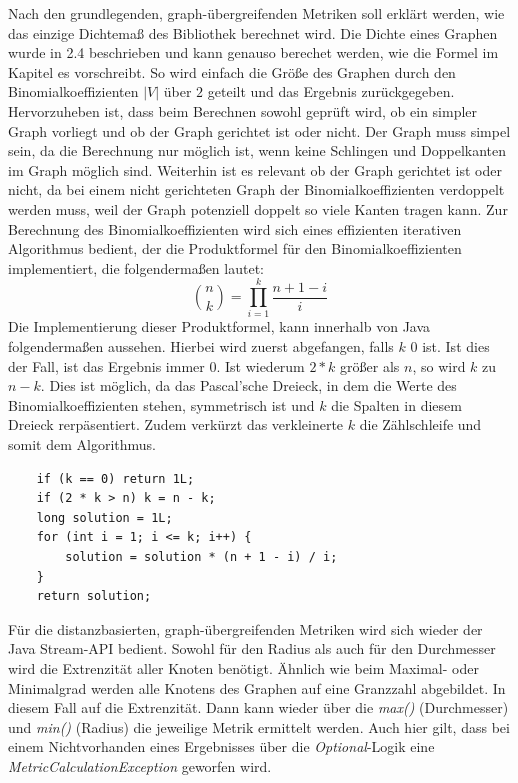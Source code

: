\documentclass[a4paper,12pt,ngerman,chapterprefix=false,listof=totoc,bibliography=totoc]{scrreprt}
\begin{document}
{{{Nach den grundlegenden, graph-übergreifenden Metriken soll erklärt werden, wie das einzige Dichtemaß des Bibliothek berechnet wird. Die Dichte eines Graphen wurde in 2.4 beschrieben und kann genauso berechet werden, wie die Formel im Kapitel es vorschreibt. So wird einfach die Größe des Graphen durch den Binomialkoeffizienten \(|V|\) über \(2\) geteilt und das Ergebnis zurückgegeben. Hervorzuheben ist, dass beim Berechnen sowohl geprüft wird, ob ein simpler Graph vorliegt und ob der Graph gerichtet ist oder nicht. Der Graph muss simpel sein, da die Berechnung nur möglich ist, wenn keine Schlingen und Doppelkanten im Graph möglich sind. Weiterhin ist es relevant ob der Graph gerichtet ist oder nicht, da bei einem nicht gerichteten Graph der Binomialkoeffizienten verdoppelt werden muss, weil der Graph potenziell doppelt so viele Kanten tragen kann. Zur Berechnung des Binomialkoeffizienten wird sich eines effizienten iterativen Algorithmus bedient, der die Produktformel für den Binomialkoeffizienten implementiert, die folgendermaßen lautet:
\[
	\binom{n}{k}=\prod_{i=1}^{k}\frac{n+1-i}{i}
\]
Die Implementierung dieser Produktformel, kann innerhalb von Java folgendermaßen aussehen. Hierbei wird zuerst abgefangen, falls \(k\) 0 ist. Ist dies der Fall, ist das Ergebnis immer 0. Ist wiederum \(2 * k\) größer als \(n\), so wird \(k\) zu \(n - k\). Dies ist möglich, da das Pascal'sche Dreieck, in dem die Werte des Binomialkoeffizienten stehen, symmetrisch ist und \(k\) die Spalten in diesem Dreieck rerpäsentiert. Zudem verkürzt das verkleinerte \(k\) die Zählschleife und somit dem Algorithmus.
\begin{lstlisting}
	if (k == 0) return 1L;
	if (2 * k > n) k = n - k;
	long solution = 1L;
	for (int i = 1; i <= k; i++) {
		solution = solution * (n + 1 - i) / i;
	}
	return solution;
\end{lstlisting}
Für die distanzbasierten, graph-übergreifenden Metriken wird sich wieder der Java Stream-API bedient. Sowohl für den Radius als auch für den Durchmesser wird die Extrenzität aller Knoten benötigt. Ähnlich wie beim Maximal- oder Minimalgrad werden alle Knotens des Graphen auf eine Granzzahl abgebildet. In diesem Fall auf die Extrenzität. Dann kann wieder über die \textit{max()} (Durchmesser) und \textit{min()} (Radius) die jeweilige Metrik ermittelt werden. Auch hier gilt, dass bei einem Nichtvorhanden eines Ergebnisses über die \textit{Optional}-Logik eine \textit{MetricCalculationException} geworfen wird.

}}}
\end{document}
